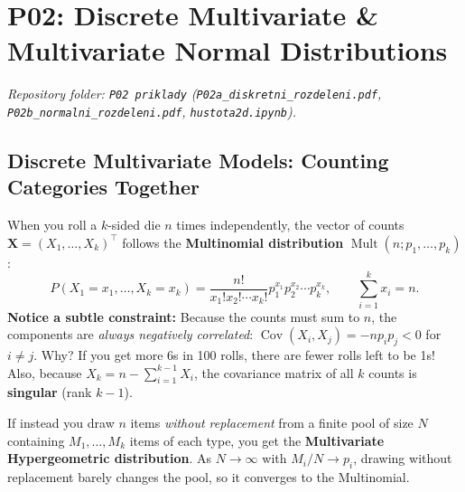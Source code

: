 \documentclass[11pt, a4paper]{article}
\begin{document}
\section{P02: Discrete Multivariate \& Multivariate Normal Distributions}
\emph{Repository folder: \texttt{P02 priklady} (\texttt{P02a\_diskretni\_rozdeleni.pdf}, \texttt{P02b\_normalni\_rozdeleni.pdf}, \texttt{hustota2d.ipynb}).}

\subsection{Discrete Multivariate Models: Counting Categories Together}
When you roll a $k$-sided die $n$ times independently, the vector of counts $\mathbf{X} = (X_1, \dots, X_k)^\top$ follows the \textbf{Multinomial distribution} $\operatorname{Mult}(n; p_1, \dots, p_k)$:
\[
    P(X_1 = x_1, \dots, X_k = x_k) = \frac{n!}{x_1! x_2! \cdots x_k!} p_1^{x_1} p_2^{x_2} \cdots p_k^{x_k}, \qquad \sum_{i=1}^k x_i = n.
\]
\textbf{Notice a subtle constraint:} Because the counts must sum to $n$, the components are \emph{always negatively correlated}: $\operatorname{Cov}(X_i, X_j) = -n p_i p_j < 0$ for $i \neq j$. Why? If you get more 6s in 100 rolls, there are fewer rolls left to be 1s! Also, because $X_k = n - \sum_{i=1}^{k-1} X_i$, the covariance matrix of all $k$ counts is \textbf{singular} (rank $k-1$).

If instead you draw $n$ items \emph{without replacement} from a finite pool of size $N$ containing $M_1, \dots, M_k$ items of each type, you get the \textbf{Multivariate Hypergeometric distribution}. As $N \to \infty$ with $M_i/N \to p_i$, drawing without replacement barely changes the pool, so it converges to the Multinomial.
\end{document}
